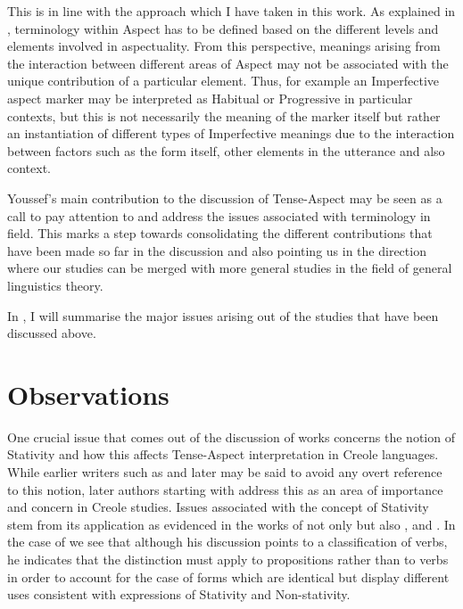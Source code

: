 This is in line with the approach which I have taken in this work.  As
explained in , terminology within Aspect has to be defined
based on the different levels and elements involved in aspectuality.
From this perspective, meanings arising from the interaction between
different areas of Aspect may not be associated with the unique
contribution of a particular element.  Thus, for example an
Imperfective aspect marker may be interpreted as Habitual or
Progressive in particular contexts, but this is not necessarily the
meaning of the marker itself but rather an instantiation of different
types of Imperfective meanings due to the interaction between factors
such as the form itself, other elements in the utterance and also
context.

Youssef’s main contribution to the discussion of Tense-Aspect may be
seen as a call to pay attention to and address the issues associated
with terminology in field.  This marks a step towards consolidating
the different contributions that have been made so far in the
discussion and also pointing us in the direction where our studies can
be merged with more general studies in the field of general
linguistics theory.

In , I will summarise the major issues arising out of
the studies that have been discussed above.


\section{Observations}\label{sec:2.2}

One crucial issue that comes out of the discussion of works concerns
the notion of Stativity and how this affects Tense-Aspect
interpretation in Creole languages.  While earlier writers such as
\citet{Voorhoeve1957} and later \citet{Alleyne1980} may be said to
avoid any overt reference to this notion, later authors starting with
\citet{Bickerton1975} address this as an area of importance and
concern in Creole studies.  Issues associated with the concept of
Stativity stem from its application as evidenced in the works of not
only \citet{Bickerton1975} but also \citet{Jaganauth1987},
\citet{Gooden2008} and \citet{Sidnell2002}.  In the case of
\citet{Bickerton1975} we see that although his discussion points to a
classification of verbs, he indicates that the distinction must apply
to propositions rather than to verbs in order to account for the case
of forms which are identical but display different uses consistent
with expressions of Stativity and Non-stativity.

